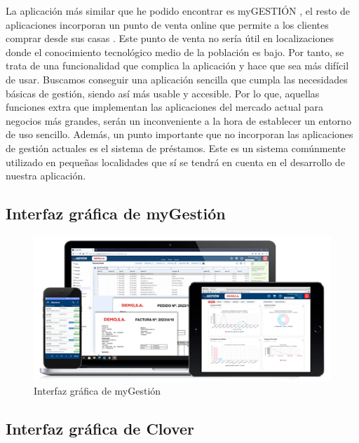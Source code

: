 La aplicación más similar que he podido encontrar es myGESTIÓN \cite{myGestion}, el resto de aplicaciones incorporan un punto de venta online que permite a los clientes comprar desde sus casas \cite{clover}. Este punto de venta no sería útil en localizaciones donde el conocimiento tecnológico medio de la población es bajo. Por tanto, se trata de una funcionalidad que complica la aplicación y hace que sea más difícil de usar. Buscamos conseguir una aplicación sencilla que cumpla las necesidades básicas de gestión, siendo así más usable y accesible. Por lo que, aquellas funciones extra que implementan las aplicaciones del mercado actual para negocios más grandes, serán un inconveniente a la hora de establecer un entorno de uso sencillo. Además, un punto importante que no incorporan las aplicaciones de gestión actuales es el sistema de préstamos. Este es un sistema comúnmente utilizado en pequeñas localidades que sí se tendrá en cuenta en el desarrollo de nuestra aplicación. 

\subsection{Interfaz gráfica de myGestión}


\begin{figure}[H]
	\centering
	\includegraphics[width=1\textwidth]{imagenes/aplicacionesSimilares/caracteristicas-mygestion.png}
	\caption{Interfaz gráfica de myGestión}
\end{figure}

\subsection{Interfaz gráfica de Clover}

